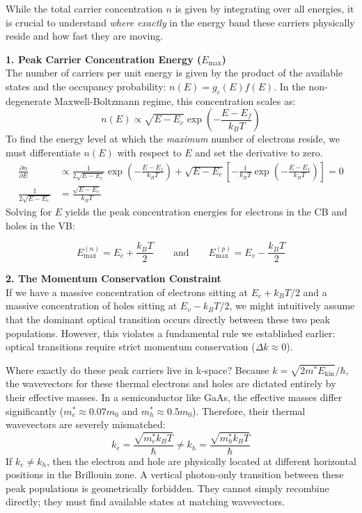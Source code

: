 While the total carrier concentration $n$ is given by integrating over all energies, it is crucial to understand \emph{where exactly} in the energy band these carriers physically reside and how fast they are moving.

\textbf{1. Peak Carrier Concentration Energy ($E_{\text{max}}$)} \\
The number of carriers per unit energy is given by the product of the available states and the occupancy probability: $n(E) = g_c(E) f(E)$. In the non-degenerate Maxwell-Boltzmann regime, this concentration scales as:
\begin{equation*}
    n(E) \propto \sqrt{E - E_c} \exp\!\left(-\frac{E - E_f}{k_B T}\right)
\end{equation*}
To find the energy level at which the \emph{maximum} number of electrons reside, we must differentiate $n(E)$ with respect to $E$ and set the derivative to zero.
\begin{align*}
    \frac{\partial n}{\partial E} & \propto \frac{1}{2\sqrt{E - E_c}} \exp\!\left(-\frac{E - E_f}{k_B T}\right) + \sqrt{E - E_c} \left[ -\frac{1}{k_B T} \exp\!\left(-\frac{E - E_f}{k_B T}\right) \right] = 0 \\
    \frac{1}{2\sqrt{E - E_c}}     & = \frac{\sqrt{E - E_c}}{k_B T}
\end{align*}
Solving for $E$ yields the peak concentration energies for electrons in the CB and holes in the VB:
\begin{keyresult}
    \begin{equation}
        E_{\text{max}}^{(n)} = E_c + \frac{k_B T}{2} \qquad \text{and} \qquad E_{\text{max}}^{(p)} = E_v - \frac{k_B T}{2}
    \end{equation}
\end{keyresult}

\textbf{2. The Momentum Conservation Constraint} \\
If we have a massive concentration of electrons sitting at $E_c + k_B T/2$ and a massive concentration of holes sitting at $E_v - k_B T/2$, we might intuitively assume that the dominant optical transition occurs directly between these two peak populations. However, this violates a fundamental rule we established earlier: optical transitions require strict momentum conservation ($\Delta k \approx 0$).

Where exactly do these peak carriers live in k-space? Because $k = \sqrt{2m^* E_{\text{kin}}}/\hbar$, the wavevectors for these thermal electrons and holes are dictated entirely by their effective masses. In a semiconductor like GaAs, the effective masses differ significantly ($m_e^* \approx 0.07 m_0$ and $m_h^* \approx 0.5 m_0$). Therefore, their thermal wavevectors are severely mismatched:
\begin{equation*}
    k_e = \frac{\sqrt{m_e^* k_B T}}{\hbar} \neq k_h = \frac{\sqrt{m_h^* k_B T}}{\hbar}
\end{equation*}
If $k_e \neq k_h$, then the electron and hole are physically located at different horizontal positions in the Brillouin zone. A vertical photon-only transition between these peak populations is geometrically forbidden. They cannot simply recombine directly; they must find available states at matching wavevectors.



